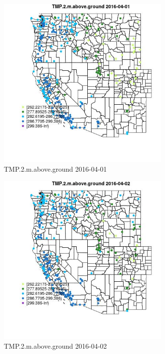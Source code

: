\begin{figure} 
\centering  
\includegraphics[width=0.77\textwidth]{Code_Outputs/Report_ML_input_PM25_Step4_part_e_de_duplicated_aveswNAs_MapObsTMP2maboveground2016-04-01.jpg} 
\caption{\label{fig:Report_ML_input_PM25_Step4_part_e_de_duplicated_aveswNAsMapObsTMP2maboveground2016-04-01}TMP.2.m.above.ground 2016-04-01} 
\end{figure} 
 

\clearpage 

\begin{figure} 
\centering  
\includegraphics[width=0.77\textwidth]{Code_Outputs/Report_ML_input_PM25_Step4_part_e_de_duplicated_aveswNAs_MapObsTMP2maboveground2016-04-02.jpg} 
\caption{\label{fig:Report_ML_input_PM25_Step4_part_e_de_duplicated_aveswNAsMapObsTMP2maboveground2016-04-02}TMP.2.m.above.ground 2016-04-02} 
\end{figure} 
 

